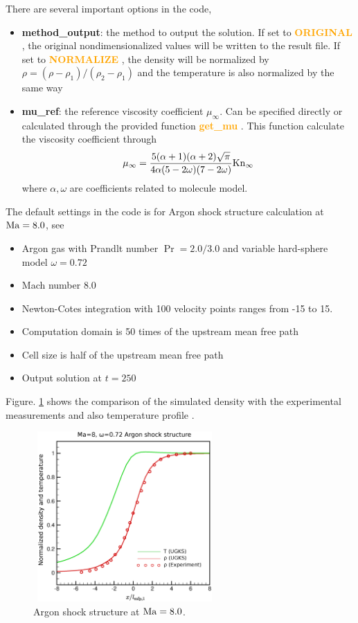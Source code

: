 \documentclass[a4paper]{book}
\newcommand{\hi}[1]{
    \textbf{\textcolor{orange}{#1}}
}
\begin{document}
There are several important options in the code,
\begin{itemize}
    \item \textbf{method\_output}: the method to output the solution. If set to \hi{ORIGINAL}, the original nondimensionalized values will be written to the result file. If set to \hi{NORMALIZE}, the density will be normalized by $\rho = (\rho-\rho_1)/(\rho_2-\rho_1)$ and the temperature is also normalized by the same way
    \item \textbf{mu\_ref}: the reference viscosity coefficient $\mu_\infty$. Can be specified directly or calculated through the provided function \hi{get\_mu}. This function calculate the viscosity coefficient through
        $$\mu_\infty = \frac{5(\alpha+1)(\alpha+2)\sqrt{\pi}}{4\alpha(5-2\omega)(7-2\omega)}{\rm Kn}_\infty$$
        where $\alpha,\omega$ are coefficients related to molecule model. 
\end{itemize}

The default settings in the code is for Argon shock structure calculation at ${\rm Ma}=8.0$, see \cite{Xu2011}
\begin{itemize}
    \item Argon gas with Prandlt number $\Pr=2.0/3.0$ and variable hard-sphere model $\omega=0.72$
    \item Mach number 8.0
    \item Newton-Cotes integration with 100 velocity points ranges from -15 to 15.
    \item Computation domain is 50 times of the upstream mean free path
    \item Cell size is half of the upstream mean free path
    \item Output solution at $t=250$
\end{itemize}

Figure. \ref{pic:shock_solution} shows the comparison of the simulated density with the experimental measurements \cite{Alsmeyer1976} and also temperature profile .

\begin{figure}[htb!]
    \centering
    \includegraphics[width=7cm,height=6.5cm]{shock_Ma8.eps}
    \caption{Argon shock structure at ${\rm Ma}=8.0$.}
    \label{pic:shock_solution}
\end{figure}
\end{document}
